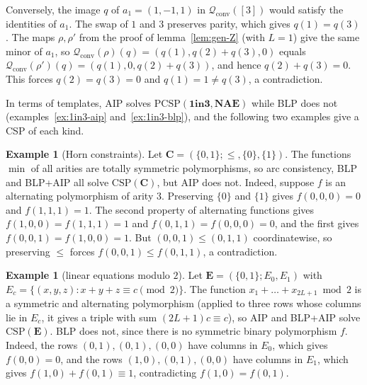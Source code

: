 \documentclass[11pt]{article}
\theoremstyle{plain}
\theoremstyle{definition}
\newtheorem{example}[theorem]{Example}
\newcommand{\Qc}{\mathscr{Q}_{\mathrm{conv}}}
\newcommand{\OIT}{\mathbf{1in3}}
\newcommand{\NAE}{\mathbf{NAE}}
\newcommand{\PCSP}{\mathrm{PCSP}}
\newcommand{\CSP}{\mathrm{CSP}}
\begin{document}
Conversely, the image $q$ of $a_1=(1,-1,1)$ in $\Qc([3])$ would satisfy the identities of $a_1$. The swap of $1$ and $3$ preserves parity, which gives $q(1)=q(3)$. The maps $\rho,\rho'$ from the proof of lemma~\ref{lem:gen-Z} (with $L=1$) give the same minor of $a_1$, so $\Qc(\rho)(q)=(q(1),q(2)+q(3),0)$ equals $\Qc(\rho')(q)=(q(1),0,q(2)+q(3))$, and hence $q(2)+q(3)=0$. This forces $q(2)=q(3)=0$ and $q(1)=1\neq q(3)$, a contradiction.

In terms of templates, AIP solves $\PCSP(\OIT,\NAE)$ while BLP does not (examples~\ref{ex:1in3-aip} and~\ref{ex:1in3-blp}), and the following two examples give a CSP of each kind.

\begin{example}[Horn constraints]\label{ex:horn}
Let $\mathbf C=(\{0,1\};\leq,\{0\},\{1\})$. The functions $\min$ of all arities are totally symmetric polymorphisms, so arc consistency, BLP and BLP+AIP all solve $\CSP(\mathbf C)$, but AIP does not. Indeed, suppose $f$ is an alternating polymorphism of arity $3$. Preserving $\{0\}$ and $\{1\}$ gives $f(0,0,0)=0$ and $f(1,1,1)=1$. The second property of alternating functions gives $f(1,0,0)=f(1,1,1)=1$ and $f(0,1,1)=f(0,0,0)=0$, and the first gives $f(0,0,1)=f(1,0,0)=1$. But $(0,0,1)\leq(0,1,1)$ coordinatewise, so preserving $\leq$ forces $f(0,0,1)\leq f(0,1,1)$, a contradiction.
\end{example}

\begin{example}[linear equations modulo $2$]\label{ex:mod2}
Let $\mathbf E=(\{0,1\};E_0,E_1)$ with $E_c=\{(x,y,z) : x+y+z\equiv c\pmod 2\}$. The function $x_1+\dots+x_{2L+1}\bmod 2$ is a symmetric and alternating polymorphism (applied to three rows whose columns lie in $E_c$, it gives a triple with sum $(2L+1)c\equiv c$), so AIP and BLP+AIP solve $\CSP(\mathbf E)$. BLP does not, since there is no symmetric binary polymorphism $f$. Indeed, the rows $(0,1),(0,1),(0,0)$ have columns in $E_0$, which gives $f(0,0)=0$, and the rows $(1,0),(0,1),(0,0)$ have columns in $E_1$, which gives $f(1,0)+f(0,1)\equiv1$, contradicting $f(1,0)=f(0,1)$.
\end{example}
\end{document}
